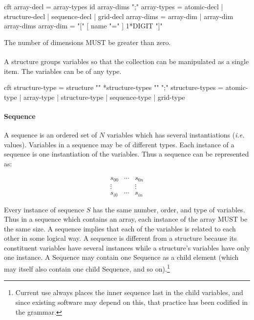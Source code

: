 \documentclass[justify]{nasa-ese}
\begin{document}
\begin{vcode}{cft}
array-decl  = array-types id array-dims ";" 
array-types = atomic-decl | structure-decl | sequence-decl | grid-decl 
array-dims  = array-dim | array-dim array-dims 
array-dim   = "[" [ name "=" ] 1*DIGIT "]" 
\end{vcode}

The number of dimensions MUST be greater than zero.

\paragraph{\Structure}
 A structure groups variables so that the collection can be
  manipulated as a single item. The variables can be of any type.

\begin{vcode}{cft}
structure-type  = structure "{" *structure-types "}" ";" 
structure-types = atomic-type | array-type 
                  | structure-type | sequence-type | grid-type 
\end{vcode}
              
\paragraph{Sequence}
 A sequence is an ordered set of $N$ variables which has
  several instantiations ({\it i.e.} values). Variables in a sequence may be of
  different types.  Each instance of a sequence is one instantiation of the
  variables. Thus a sequence can be represented as:

\begin{displaymath}
\begin{array}{ccc}
  s_{0 0} & \cdots & s_{0 n} \\
  \vdots & & \vdots \\
  s_{i 0} & \cdots & s_{i n}
\end{array}
\end{displaymath}

\noindent Every instance of sequence $S$ has the same number, order,
and type of variables. Thus in a sequence which contains an array,
each instance of the array MUST be the same size. A sequence implies
that each of the variables is related to each other in some logical
way. A sequence is different from a structure because its constituent
variables have several instances while a structure's variables have
only one instance. A Sequence may contain one Sequence as a child
element (which may itself also contain one child Sequence, and so
on).\footnote{Current use always places the inner sequence last in the
  child variables, and since existing software may depend on this,
  that practice has been codified in the grammar.}
\label{sequence-grammar}
\end{document}
